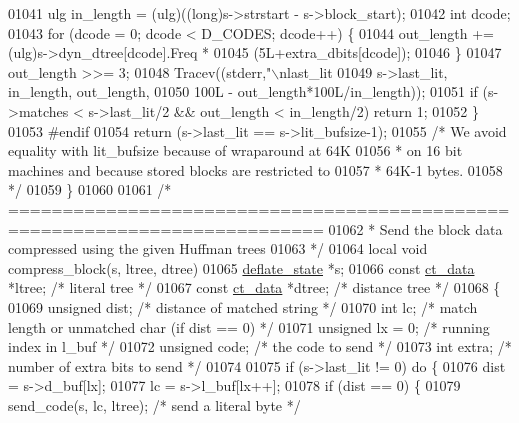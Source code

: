 \begin{DoxyCode}
{{{{{{{{{{{{{{{{{{{{{{01041         ulg in\_length = (ulg)((long)s->strstart - s->block\_start);
01042         \textcolor{keywordtype}{int} dcode;
01043         \textcolor{keywordflow}{for} (dcode = 0; dcode < D\_CODES; dcode++) \{
01044             out\_length += (ulg)s->dyn\_dtree[dcode].Freq *
01045                 (5L+extra\_dbits[dcode]);
01046         \}
01047         out\_length >>= 3;
01048         Tracev((stderr,\textcolor{stringliteral}{"\(\backslash\)nlast\_lit %
01049                s->last\_lit, in\_length, out\_length,
01050                100L - out\_length*100L/in\_length));
01051         \textcolor{keywordflow}{if} (s->matches < s->last\_lit/2 && out\_length < in\_length/2) \textcolor{keywordflow}{return} 1;
01052     \}
01053 \textcolor{preprocessor}{#endif}
01054     \textcolor{keywordflow}{return} (s->last\_lit == s->lit\_bufsize-1);
01055     \textcolor{comment}{/* We avoid equality with lit\_bufsize because of wraparound at 64K}
01056 \textcolor{comment}{     * on 16 bit machines and because stored blocks are restricted to}
01057 \textcolor{comment}{     * 64K-1 bytes.}
01058 \textcolor{comment}{     */}
01059 \}
01060 
01061 \textcolor{comment}{/* ===========================================================================}
01062 \textcolor{comment}{ * Send the block data compressed using the given Huffman trees}
01063 \textcolor{comment}{ */}
01064 local \textcolor{keywordtype}{void} compress\_block(s, ltree, dtree)
01065     \hyperlink{structinternal__state}{deflate\_state} *s;
01066     \textcolor{keyword}{const} \hyperlink{structct__data__s}{ct\_data} *ltree; \textcolor{comment}{/* literal tree */}
01067     \textcolor{keyword}{const} \hyperlink{structct__data__s}{ct\_data} *dtree; \textcolor{comment}{/* distance tree */}
01068 \{
01069     \textcolor{keywordtype}{unsigned} dist;      \textcolor{comment}{/* distance of matched string */}
01070     \textcolor{keywordtype}{int} lc;             \textcolor{comment}{/* match length or unmatched char (if dist == 0) */}
01071     \textcolor{keywordtype}{unsigned} lx = 0;    \textcolor{comment}{/* running index in l\_buf */}
01072     \textcolor{keywordtype}{unsigned} code;      \textcolor{comment}{/* the code to send */}
01073     \textcolor{keywordtype}{int} extra;          \textcolor{comment}{/* number of extra bits to send */}
01074 
01075     \textcolor{keywordflow}{if} (s->last\_lit != 0) \textcolor{keywordflow}{do} \{
01076         dist = s->d\_buf[lx];
01077         lc = s->l\_buf[lx++];
01078         \textcolor{keywordflow}{if} (dist == 0) \{
01079             send\_code(s, lc, ltree); \textcolor{comment}{/* send a literal byte */}
}}}}}}}}}}}}}}}}}}}}}}}
\end{DoxyCode}
